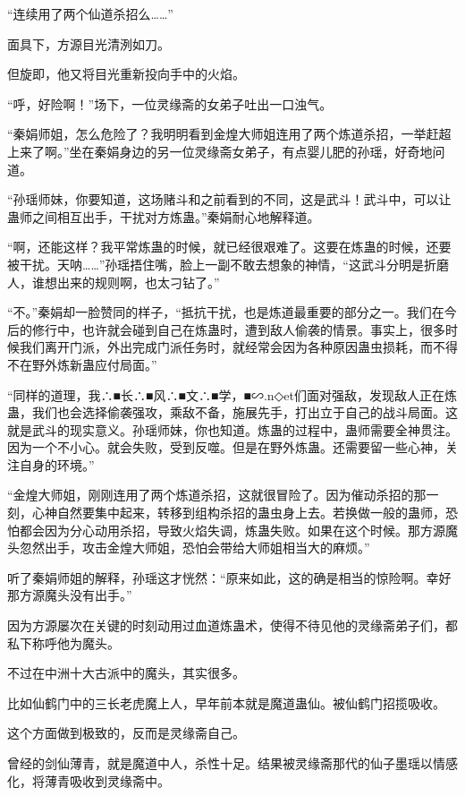 
\begin{this_body}

“连续用了两个仙道杀招么……”

面具下，方源目光清洌如刀。

但旋即，他又将目光重新投向手中的火焰。

“呼，好险啊！”场下，一位灵缘斋的女弟子吐出一口浊气。

“秦娟师姐，怎么危险了？我明明看到金煌大师姐连用了两个炼道杀招，一举赶超上来了啊。”坐在秦娟身边的另一位灵缘斋女弟子，有点婴儿肥的孙瑶，好奇地问道。

“孙瑶师妹，你要知道，这场赌斗和之前看到的不同，这是武斗！武斗中，可以让蛊师之间相互出手，干扰对方炼蛊。”秦娟耐心地解释道。

“啊，还能这样？我平常炼蛊的时候，就已经很艰难了。这要在炼蛊的时候，还要被干扰。天呐……”孙瑶捂住嘴，脸上一副不敢去想象的神情，“这武斗分明是折磨人，谁想出来的规则啊，也太刁钻了。”

“不。”秦娟却一脸赞同的样子，“抵抗干扰，也是炼道最重要的部分之一。我们在今后的修行中，也许就会碰到自己在炼蛊时，遭到敌人偷袭的情景。事实上，很多时候我们离开门派，外出完成门派任务时，就经常会因为各种原因蛊虫损耗，而不得不在野外炼新蛊应付局面。”

“同样的道理，我∴■长∴■风∴■文∴■学，■∽.n◇et们面对强敌，发现敌人正在炼蛊，我们也会选择偷袭强攻，乘敌不备，施展先手，打出立于自己的战斗局面。这就是武斗的现实意义。孙瑶师妹，你也知道。炼蛊的过程中，蛊师需要全神贯注。因为一个不小心。就会失败，受到反噬。但是在野外炼蛊。还需要留一些心神，关注自身的环境。”

“金煌大师姐，刚刚连用了两个炼道杀招，这就很冒险了。因为催动杀招的那一刻，心神自然要集中起来，转移到组构杀招的蛊虫身上去。若换做一般的蛊师，恐怕都会因为分心动用杀招，导致火焰失调，炼蛊失败。如果在这个时候。那方源魔头忽然出手，攻击金煌大师姐，恐怕会带给大师姐相当大的麻烦。”

听了秦娟师姐的解释，孙瑶这才恍然：“原来如此，这的确是相当的惊险啊。幸好那方源魔头没有出手。”

因为方源屡次在关键的时刻动用过血道炼蛊术，使得不待见他的灵缘斋弟子们，都私下称呼他为魔头。

不过在中洲十大古派中的魔头，其实很多。

比如仙鹤门中的三长老虎魔上人，早年前本就是魔道蛊仙。被仙鹤门招揽吸收。

这个方面做到极致的，反而是灵缘斋自己。

曾经的剑仙薄青，就是魔道中人，杀性十足。结果被灵缘斋那代的仙子墨瑶以情感化，将薄青吸收到灵缘斋中。


\end{this_body}
